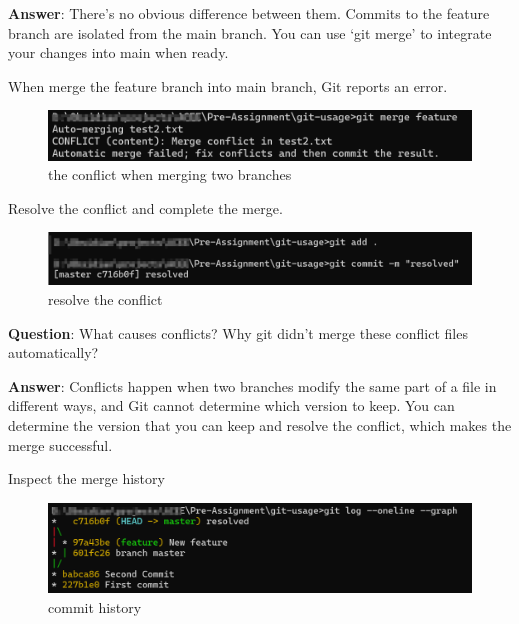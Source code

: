 \textbf{Answer}: There's no obvious difference between them. Commits to the feature branch are isolated from the main branch. You can use `git merge' to integrate your changes into main when ready.

When merge the feature branch into main branch, Git reports an error.
\begin{figure}[H]
\centering
\includegraphics[width = \textwidth]{./figures/conflict.png}
\caption{the conflict when merging two branches}
\end{figure}
Resolve the conflict and complete the merge.
\begin{figure}[H]
\centering
\includegraphics[width = \textwidth]{./figures/resolved.png}
\caption{resolve the conflict}
\end{figure}

\textbf{Question}: What causes conflicts? Why git didn't merge these conflict files automatically?

\textbf{Answer}: Conflicts happen when two branches modify the same part of a file in different ways, and Git cannot determine which version to keep.
You can determine the version that you can keep and resolve the conflict, which makes the merge successful.

Inspect the merge history
\begin{figure}[H]
    \centering
    \includegraphics[width = \textwidth]{./figures/graph.png}
    \caption{commit history}
\end{figure}

